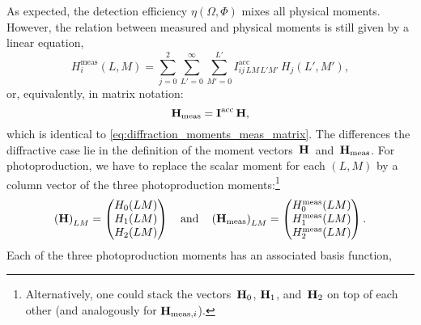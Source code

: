 As expected, the detection
efficiency $\eta(\Omega, \Phi)$ mixes all physical moments.  However,
the relation between measured and physical moments is still given by a
linear equation, \ie
\begin{equation}
  H_i^\text{meas}(L, M)
  = \sum_{j = 0}^2 \sum_{L' = 0}^\infty \sum_{M' = 0}^{L'}
  I^\text{acc}_{i j\, L M\, L' M'}\, H_j(L', M'),
\end{equation}
or, equivalently, in matrix notation:
\begin{equation}
  \label{eq:photoprod_moments_meas_matrix}
  \bm{\mathrm{H}}_\text{meas}
  = \bm{\mathrm{I}}^\text{acc}\, \bm{\mathrm{H}},
\end{equation}
which is identical to \cref{eq:diffraction_moments_meas_matrix}.  The
differences \wrt the diffractive case lie in the definition of the
moment vectors~$\bm{\mathrm{H}}$~and~$\bm{\mathrm{H}}_\text{meas}$.  For
photoproduction, we have to replace the scalar moment for each $(L,
M)$ by a column vector of the three photoproduction
moments:\footnote{Alternatively, one could stack the
vectors~$\bm{\mathrm{H}}_0$, $\bm{\mathrm{H}}_1$, and~$\bm{\mathrm{H}}_2$ on top of each
other (and analogously for $\bm{\mathrm{H}}_{\text{meas}, i}$).}
\begin{equation}
  \rBrk[0]{\vect{H}}_{L M}
  = \begin{pmatrix}
    H_0(L M) \\
    H_1(L M) \\
    H_2(L M)
  \end{pmatrix}
  \quad\text{and}\quad
  \rBrk[0]{\vect{H}_\text{meas}}_{L M}
  = \begin{pmatrix}
    H^\text{meas}_0(L M) \\
    H^\text{meas}_1(L M) \\
    H^\text{meas}_2(L M)
  \end{pmatrix}.
\end{equation}
Each of the three photoproduction moments has an associated basis
function, \ie
